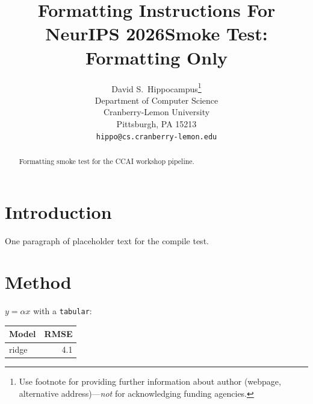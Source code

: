 \documentclass{article}
\title{Formatting Instructions For NeurIPS 2026}
\author{%
  David S.~Hippocampus\thanks{Use footnote for providing further information
    about author (webpage, alternative address)---\emph{not} for acknowledging
    funding agencies.} \\
  Department of Computer Science\\
  Cranberry-Lemon University\\
  Pittsburgh, PA 15213 \\
  \texttt{hippo@cs.cranberry-lemon.edu} \\
}
\begin{document}
\title{Smoke Test: Formatting Only}
\author{\AuthorNames}
\date{}
\maketitle
\begin{abstract}Formatting smoke test for the CCAI workshop pipeline.\end{abstract}
\section{Introduction}One paragraph of placeholder text for the compile test.
\section{Method}$y = \alpha x$ with a \texttt{tabular}: 
\begin{table}[h]\centering\begin{tabular}{lr}\toprule Model & RMSE \\ \midrule ridge & 4.1 \\ \bottomrule\end{tabular}\end{table}


\end{document}
